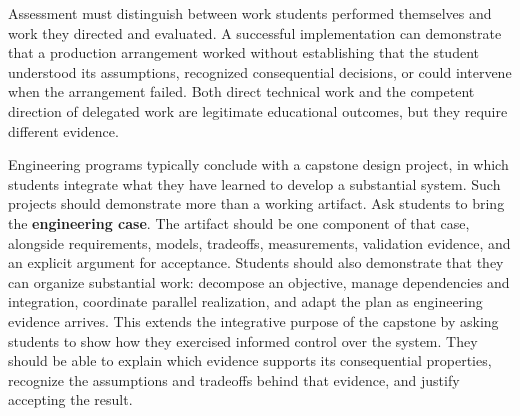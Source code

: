 
Assessment must distinguish between work students performed themselves and work they directed and evaluated. A successful implementation can demonstrate that a production arrangement worked without establishing that the student understood its assumptions, recognized consequential decisions, or could intervene when the arrangement failed. Both direct technical work and the competent direction of delegated work are legitimate educational outcomes, but they require different evidence.


Engineering programs typically conclude with a capstone design project, in which students integrate what they have learned to develop a substantial system. Such projects should demonstrate more than a working artifact. Ask students to bring the \textbf{engineering case}. The artifact should be one component of that case, alongside requirements, models, tradeoffs, measurements, validation evidence, and an explicit argument for acceptance. Students should also demonstrate that they can organize substantial work: decompose an objective, manage dependencies and integration, coordinate parallel realization, and adapt the plan as engineering evidence arrives. This extends the integrative purpose of the capstone by asking students to show how they exercised informed control over the system. They should be able to explain which evidence supports its consequential properties, recognize the assumptions and tradeoffs behind that evidence, and justify accepting the result.

